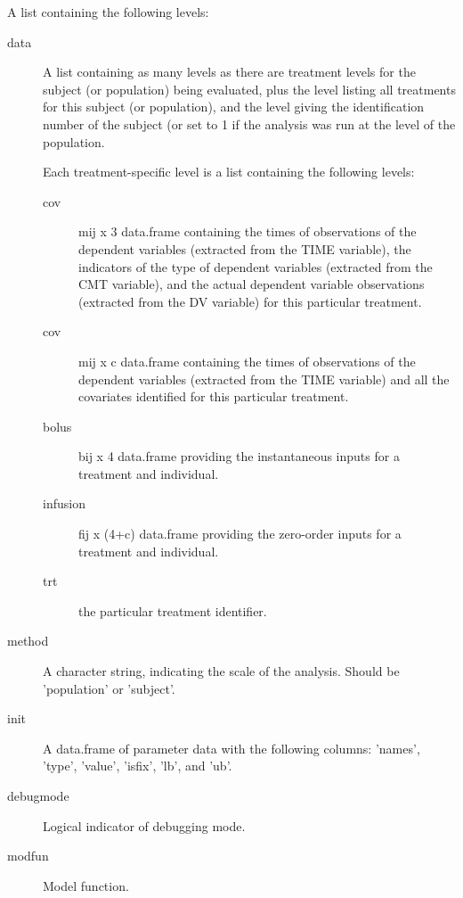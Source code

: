 \begin{Arguments}
\begin{ldescription}
\item[\code{problem}] A list containing the following levels:\begin{description}

\item[data] A list containing as many levels as there are treatment levels 
for the subject (or population) being evaluated, plus the  
level listing all treatments for this subject (or population), and the 
 level giving the identification number of the subject (or set to
1 if the analysis was run at the level of the population.

Each treatment-specific level is a list containing the following levels: 
\begin{description}

\item[cov] mij x 3 data.frame containing the times of observations of the
dependent variables (extracted from the TIME variable), the indicators
of the type of dependent variables (extracted from the CMT variable),
and the actual dependent variable observations (extracted from the 
DV variable) for this particular treatment.
\item[cov] mij x c data.frame containing the times of observations of 
the dependent variables (extracted from the TIME variable) and all the
covariates identified for this particular treatment.
\item[bolus] bij x 4 data.frame providing the instantaneous inputs 
for a treatment and individual.
\item[infusion] fij x (4+c) data.frame providing the zero-order inputs for
a treatment and individual.
\item[trt] the particular treatment identifier.
\end{description}


\item[method] A character string, indicating the scale of the analysis. Should
be 'population' or 'subject'.
\item[init] A data.frame of parameter data with the following columns:
'names', 'type', 'value', 'isfix', 'lb', and 'ub'.
\item[debugmode] Logical indicator of debugging mode.
\item[modfun] Model function.

\end{description}



\end{ldescription}
\end{Arguments}
